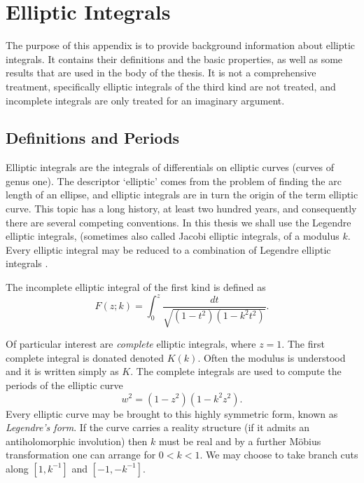 
\chapter{Elliptic Integrals}
\label{chp:Elliptic Integrals}

\stoptocentries

The purpose of this appendix is to provide background information about elliptic integrals. It contains their definitions and the basic properties, as well as some results that are used in the body of the thesis. It is not a comprehensive treatment, specifically elliptic integrals of the third kind are not treated, and incomplete integrals are only treated for an imaginary argument.

\section{Definitions and Periods}
Elliptic integrals are the integrals of differentials on elliptic curves (curves of genus one). The descriptor `elliptic' comes from the problem of finding the arc length of an ellipse, and elliptic integrals are in turn the origin of the term elliptic curve. This topic has a long history, at least two hundred years, and consequently there are several competing conventions. In this thesis we shall use the Legendre elliptic integrals, (sometimes also called Jacobi elliptic integrals, of a modulus $k$. Every elliptic integral may be reduced to a combination of Legendre elliptic integrals \cite{armitage2006elliptic,Hancock1910}.

\begin{defn}
The incomplete elliptic integral of the first kind is defined as
\[
F(z;k) = \int_0^z \frac{dt}{\sqrt{(1-t^2)(1-k^2 t^2)}}.
\]
\end{defn}

Of particular interest are \emph{complete} elliptic integrals, where $z=1$. The first complete integral is donated denoted $K(k)$. Often the modulus is understood and it is written simply as $K$. The complete integrals are used to compute the periods of the elliptic curve
\[
w^2 = (1-z^2)(1-k^2 z^2).
\]
Every elliptic curve may be brought to this highly symmetric form, known as {\it Legendre's form}. If the curve carries a reality structure (if it admits an antiholomorphic involution) then $k$ must be real and by a further M\"obius transformation one can arrange for $0 < k < 1$. We may choose to take branch cuts along $[1,k^{-1}]$ and $[-1,-k^{-1}]$.

